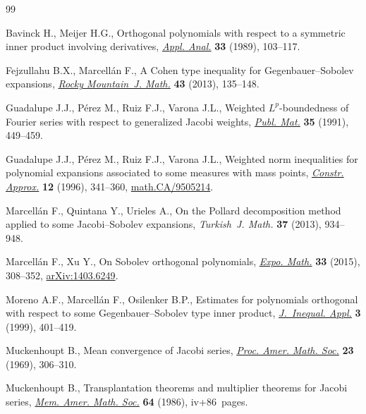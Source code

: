\documentclass[pdftex]{sigma}
\numberwithin{equation}{section}
\begin{document}
\begin{thebibliography}{99}
\footnotesize\itemsep=0pt

Bavinck H., Meijer H.G., Orthogonal polynomials with respect to a symmetric
 inner product involving derivatives, \href{https://doi.org/10.1080/00036818908839864}{\textit{Appl. Anal.}} \textbf{33} (1989),
 103--117.

Fejzullahu B.X., Marcell\'an F., A {C}ohen type inequality for
 {G}egenbauer--{S}obolev expansions, \href{https://doi.org/10.1216/RMJ-2013-43-1-135}{\textit{Rocky Mountain~J. Math.}}
 \textbf{43} (2013), 135--148.

Guadalupe J.J., P\'erez M., Ruiz F.J., Varona J.L., Weighted
 {$L^p$}-boundedness of {F}ourier series with respect to generalized {J}acobi
 weights, \href{https://doi.org/10.5565/PUBLMAT_35291_08}{\textit{Publ. Mat.}} \textbf{35} (1991), 449--459.

Guadalupe J.J., P\'erez M., Ruiz F.J., Varona J.L., Weighted norm inequalities
 for polynomial expansions associated to some measures with mass points,
 \href{https://doi.org/10.1007/s003659900018}{\textit{Constr. Approx.}} \textbf{12} (1996), 341--360,
 \href{https://arxiv.org/abs/math.CA/9505214}{math.CA/9505214}.

Marcell\'an F., Quintana Y., Urieles A., On the {P}ollard decomposition method
 applied to some {J}acobi--{S}obolev expansions, \textit{Turkish~J. Math.}
 \textbf{37} (2013), 934--948.

Marcell\'an F., Xu Y., On {S}obolev orthogonal polynomials, \href{https://doi.org/10.1016/j.exmath.2014.10.002}{\textit{Expo.
 Math.}} \textbf{33} (2015), 308--352, \href{https://arxiv.org/abs/1403.6249}{arXiv:1403.6249}.

Moreno A.F., Marcell\'an F., Osilenker B.P., Estimates for polynomials
 orthogonal with respect to some {G}egenbauer--{S}obolev type inner product,
 \href{https://doi.org/10.1155/S1025583499000260}{\textit{J.~Inequal. Appl.}} \textbf{3} (1999), 401--419.

Muckenhoupt B., Mean convergence of {J}acobi series, \href{https://doi.org/10.2307/2037162}{\textit{Proc. Amer. Math.
 Soc.}} \textbf{23} (1969), 306--310.

Muckenhoupt B., Transplantation theorems and multiplier theorems for {J}acobi
 series, \href{https://doi.org/10.1090/memo/0356}{\textit{Mem. Amer. Math. Soc.}} \textbf{64} (1986), iv+86~pages.


\end{thebibliography}
\end{document}
